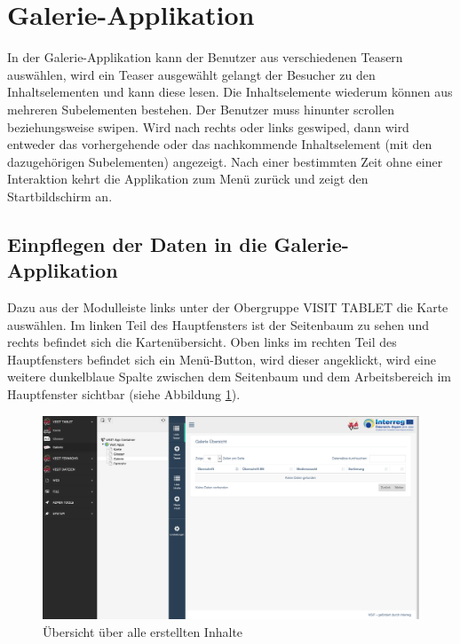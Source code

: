 \cleardoublepage

\section{Galerie-Applikation}

In der Galerie-Applikation kann der Benutzer aus verschiedenen Teasern auswählen, wird ein Teaser ausgewählt gelangt der Besucher zu den Inhaltselementen und kann diese lesen. Die Inhaltselemente wiederum können aus mehreren Subelementen bestehen. Der Benutzer muss hinunter scrollen beziehungsweise swipen.
Wird nach rechts oder links geswiped, dann wird entweder das vorhergehende oder das nachkommende Inhaltselement (mit den dazugehörigen Subelementen) angezeigt.
Nach einer bestimmten Zeit ohne einer Interaktion kehrt die Applikation zum Menü zurück und zeigt den Startbildschirm an.

\subsection{Einpflegen der Daten in die Galerie-Applikation}

Dazu aus der Modulleiste links unter der Obergruppe VISIT TABLET die Karte auswählen. Im linken Teil des Hauptfensters ist der Seitenbaum zu sehen und rechts befindet sich die Kartenübersicht. Oben links im rechten Teil des Hauptfensters befindet sich ein Menü-Button, wird dieser angeklickt, wird eine weitere dunkelblaue Spalte zwischen dem Seitenbaum und dem Arbeitsbereich im Hauptfenster sichtbar (siehe Abbildung \ref{img:uebersicht_galerie}).

\begin{figure}[ht!]
\centering
\includegraphics[width=12cm]{Figures/paula/galerie/uebersicht_galerie.png}
\caption{Übersicht über alle erstellten Inhalte}
\label{img:uebersicht_galerie}
\end{figure}

